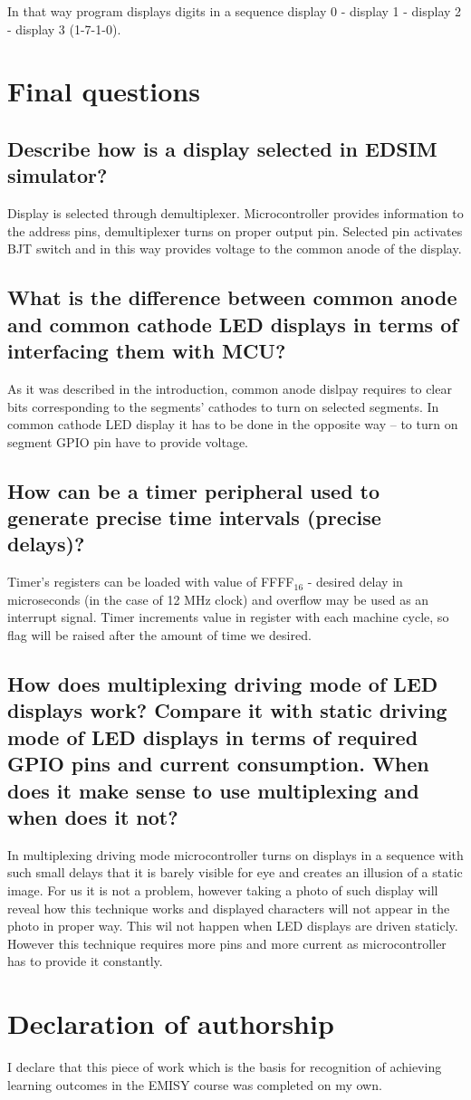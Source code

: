 \documentclass{article}
\begin{document}
In that way program displays digits in a sequence display 0 - display 1 - display 2 - display 3 (1-7-1-0).

\section{Final questions}
\subsection*{Describe how is a display selected in EDSIM simulator?}
Display is selected through demultiplexer. Microcontroller provides information to the address
pins, demultiplexer turns on proper output pin. Selected pin activates BJT switch and in this
way provides voltage to the common anode of the display.

\subsection*{What is the difference between common anode and common cathode LED displays in terms of interfacing them with MCU?}
As it was described in the introduction, common anode dislpay requires to clear bits
corresponding to the segments' cathodes to turn on selected segments. In common
cathode LED display it has to be done in the opposite way -- to turn on segment GPIO pin
have to provide voltage.

\subsection*{How can be a timer peripheral used to generate precise time intervals (precise delays)?}
Timer's registers can be loaded with value of FFFF$_{16}$ - desired delay in microseconds (in the case
of 12 MHz clock) and overflow may be used as an interrupt signal. Timer increments value in
register with each machine cycle, so flag will be raised after the amount of time we desired.

\subsection*{How does multiplexing driving mode of LED displays work? Compare it with static driving mode of LED displays in terms 
of required GPIO pins and current consumption. When does it make sense to use multiplexing and when does it not?}
In multiplexing driving mode microcontroller turns on displays in a sequence with such small delays
that it is barely visible for eye and creates an illusion of a static image. For us it is
not a problem, however taking a photo of such display will reveal how this technique works
and displayed characters will not appear in the photo in proper way. This wil not happen
when LED displays are driven staticly. However this technique requires more pins and more
current as microcontroller has to provide it constantly.

\section*{Declaration of authorship}
I declare that this piece of work which is the basis for recognition of achieving learning outcomes in the EMISY course was completed on my own.
\end{document}

